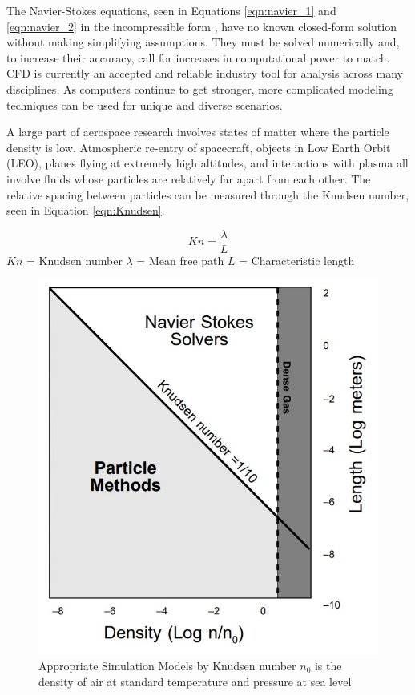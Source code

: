 \indent The Navier-Stokes equations, seen in Equations \ref{eqn:navier_1} and \ref{eqn:navier_2} in the incompressible form \cite{navier_eqns}, have no known closed-form solution without making simplifying assumptions. They must be solved numerically and, to increase their accuracy, call for increases in computational power to match. CFD is currently an accepted and reliable industry tool for analysis across many disciplines. As computers continue to get stronger, more complicated modeling techniques can be used for unique and diverse scenarios. \par

\indent A large part of aerospace research involves states of matter where the particle density is low. Atmospheric re-entry of spacecraft, objects in Low Earth Orbit (LEO), planes flying at extremely high altitudes, and interactions with plasma all involve fluids whose particles are relatively far apart from each other. The relative spacing between particles can be measured through the Knudsen number, seen in Equation \ref{eqn:Knudsen}. \par

\begin{equation}
    \label{eqn:Knudsen}
    Kn = \frac{\lambda}{L}
\end{equation}
\(Kn\) = Knudsen number \newline
\(\lambda\) = Mean free path \newline
\(L\) = Characteristic length \par


\begin{figure}
    \includegraphics[width=.55\textwidth]{figures/navier.JPG}
    \centering
    \caption[Appropriate Simulation Models by Knudsen number]{Appropriate Simulation Models by Knudsen number \textmd{\cite{navier} \(n_0\) is the density of air at standard temperature and pressure at sea level}}
    \label{fig:navier}
\end{figure}


